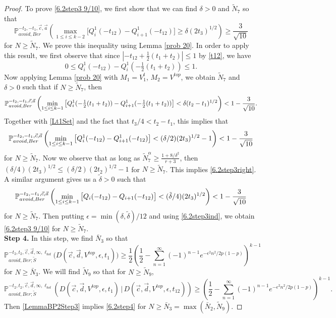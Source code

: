 \begin{proof}
	To prove \eqref{6.2step3 9/10}, we first show that we can find $\delta > 0$ and $\tilde{N}_7$ so that
	\begin{equation}\label{6.2step3right}
	\mathbb{P}^{-t_2,-t_1,\vec{c},\vec{a}}_{avoid, Ber}\left(\max_{1\leq i\leq k-2} \big[Q^1_i(-t_{12}) - Q^1_{i+1}(-t_{12})\big] \geq \delta(2t_3)^{1/2}\right) \geq \frac{3}{\sqrt{10}}
	\end{equation}
	for $N\geq\tilde{N}_7$. We prove this inequality using Lemma \ref{prob 20}. In order to apply this result, we first observe that since $|-t_{12}+\frac{1}{2}(t_1+t_2)| \leq 1$ by \eqref{t12}, we have
	\begin{equation}\label{Lt1Set}
	0 \leq Q^1_i(-t_{12})-Q^1_i(-\tfrac{1}{2}(t_1+t_2)) \leq 1.
	\end{equation}
	Now applying Lemma \ref{prob 20} with $M_1 = V_1^t$, $M_2 = V^{top}$, we obtain $\tilde{N}_7$ and $\delta>0$ such that if $N \geq \tilde{N}_7$, then
	\[
	\mathbb{P}^{-t_2,-t_1,\vec c, \vec a}_{avoid,Ber}\left(\min_{1\leq i\leq k-1} \big[Q^1_i(-\tfrac{1}{2}(t_1+t_2))-Q_{i+1}^1(-\tfrac{1}{2}(t_1+t_2))\big] < \delta(t_2-t_1)^{1/2}\right) < 1 - \frac{3}{\sqrt{10}}.
	\]
	Together with \eqref{Lt1Set} and the fact that $t_3/4 < t_2-t_1$, this implies that
	\begin{equation}\label{step3delta/2}
	\mathbb{P}^{-t_2,-t_1,\vec c, \vec a}_{avoid,Ber}\left(\min_{1\leq i\leq k-1} \big[Q_i^1(-t_{12})-Q_{i+1}^1(-t_{12})\big]<(\delta/2)(2t_3)^{1/2}-1\right) < 1 - \frac{3}{\sqrt{10}}
	\end{equation}
	for $N\geq \tilde{N}_7$. Now we observe that as long as $\tilde{N}_7^\alpha \geq \frac{1+8/\delta^2}{r+3}$, then $(\delta/4)(2t_3)^{1/2} \leq (\delta/2)(2t_2)^{1/2} - 1$ for $N\geq\tilde{N}_7$. This implies \eqref{6.2step3right}. A similar argument gives us a $\tilde{\delta}>0$ such that
	\[
	\mathbb{P}^{-t_2,-t_1,\vec c, \vec a}_{avoid,Ber}\left(\min_{1\leq i\leq k-1} \big[Q_i(-t_{12})-Q_{i+1}(-t_{12})\big]<(\tilde\delta/4)(2t_3)^{1/2}\right)<1 - \frac{3}{\sqrt{10}}
	\]
	for $N\geq\tilde{N}_7$. Then putting $\epsilon = \min(\delta,\tilde{\delta})/12$ and using \eqref{6.2step3ind}, we obtain \eqref{6.2step3 9/10} for $N\geq\tilde{N}_7$.\\
	
	{\bf \raggedleft Step 4.} In this step, we find $\bar{N}_3$ so that
	\begin{equation}\label{6.2step4}
	\mathbb{P}^{-t_2,t_2,\vec{c},\vec{d},\infty,\ell_{bot}}_{avoid,Ber;\tilde S}\big(D(\vec{c},\vec{d},V^{top},\epsilon,t_1) \big) \geq \frac{1}{2}\left(\frac{1}{2} - \sum_{n=1}^\infty (-1)^{n-1} e^{-\epsilon^2 n^2/2p(1-p)}\right)^{k-1}
	\end{equation}
	for $N\geq\bar{N}_3$. We will find $\tilde{N}_9$ so that for $N\geq\tilde{N}_9$,
	\begin{equation}\label{6.2step4sep}
	\mathbb{P}^{-t_2,t_2,\vec{c},\vec{d},\infty,\ell_{bot}}_{avoid,Ber;\tilde S}\left(D(\vec{c},\vec{d},V^{top},\epsilon,t_1) \,\big|\,D(\vec c, \vec d, V^{top}, \epsilon,t_{12})\right) \geq \left(\frac{1}{2} - \sum_{n=1}^\infty (-1)^{n-1} e^{-\epsilon^2 n^2/2p(1-p)}\right)^{k-1}.
	\end{equation}
	Then \eqref{LemmaBP2Step3} implies \eqref{6.2step4} for $N\geq\bar{N}_3 = \max(\bar{N}_2,\tilde{N}_9)$.
	

\end{proof}
